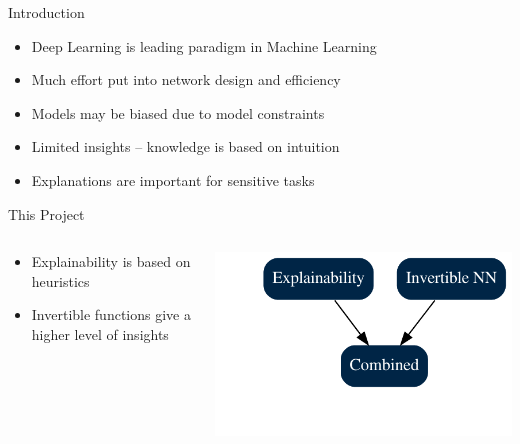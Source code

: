 \begin{frame}{Introduction}
	\begin{itemize}
		\item Deep Learning is \alert{leading paradigm} in Machine Learning
		\item Much effort put into network \alert{design} and \alert{efficiency}
		\item Models may be \alert{biased} due to model constraints
		\item Limited insights -- knowledge is based on \alert{intuition}
		\item \alert{Explanations} are important for sensitive tasks
	\end{itemize}
\end{frame}


\begin{frame}{This Project}
	\begin{columns}
		\begin{column}{0.45\textwidth}
			\begin{itemize}
				\item Explainability is based on heuristics
				\item Invertible functions give a higher level of insights
			\end{itemize}
		\end{column}
		\begin{column}{0.45\textwidth}
			\centering
			\includegraphics[width=\textwidth]{project}
		\end{column}
	\end{columns}
\end{frame}
